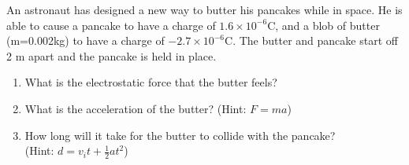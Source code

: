 \documentclass[12pt]{examdesign}
\begin{document}
\begin{shortanswer}[title={Free Response},
	rearrange=no]
	
	\begin{question}
		 An astronaut has designed a new way to butter his pancakes while in space.  He is able to cause a pancake to have a charge of $1.6 \times 10^{-6}$C, and a blob of butter (m=0.002kg) to have a charge of  $-2.7 \times 10^{-6}$C.  The butter and pancake start off 2 m apart and the pancake is held in place.  
		 \begin{enumerate}
		 	\item What is the electrostatic force that the butter feels?
		 	\vspace{1 in}
		 	\item What is the acceleration of the butter?  (Hint: $F = ma$)
		 	\vspace{1 in}
		 	\item How long will it take for the butter to collide with the pancake? \\ (Hint: $d = v_it + \frac{1}{2}at^2$)
		 	\vspace{1 in}
		 \end{enumerate}

	\end{question}

	
	\end{shortanswer}
\end{document}
